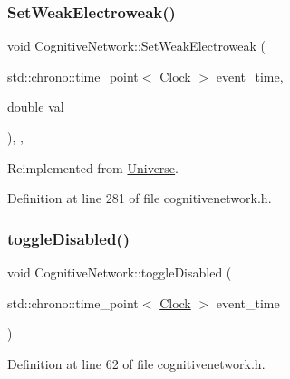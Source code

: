 \mbox{\label{class_cognitive_network_a116f6818986a622e4a318857859e2495}} 
\subsubsection{\texorpdfstring{Set\+Weak\+Electroweak()}{SetWeakElectroweak()}}
{\footnotesize\ttfamily void Cognitive\+Network\+::\+Set\+Weak\+Electroweak (\begin{DoxyParamCaption}\item[{std\+::chrono\+::time\+\_\+point$<$ \hyperlink{universe_8h_a0ef8d951d1ca5ab3cfaf7ab4c7a6fd80}{Clock} $>$}]{event\+\_\+time,  }\item[{double}]{val }\end{DoxyParamCaption})\hspace{0.3cm}{\ttfamily [inline]}, {\ttfamily [final]}, {\ttfamily [virtual]}}



Reimplemented from \hyperlink{class_universe_a2d3d642bfdc863248e93535832fa4b00}{Universe}.



Definition at line 281 of file cognitivenetwork.\+h.

\mbox{\label{class_cognitive_network_abeac08d7cbf9df4b36de40aa9301e978}} 
\subsubsection{\texorpdfstring{toggle\+Disabled()}{toggleDisabled()}}
{\footnotesize\ttfamily void Cognitive\+Network\+::toggle\+Disabled (\begin{DoxyParamCaption}\item[{std\+::chrono\+::time\+\_\+point$<$ \hyperlink{universe_8h_a0ef8d951d1ca5ab3cfaf7ab4c7a6fd80}{Clock} $>$}]{event\+\_\+time }\end{DoxyParamCaption})\hspace{0.3cm}{\ttfamily [inline]}}



Definition at line 62 of file cognitivenetwork.\+h.

